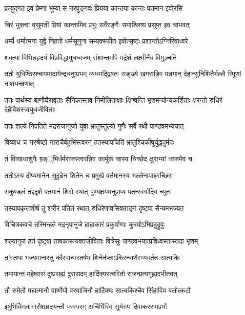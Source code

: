 \twolineshloka
{प्रत्युद्गत इव प्रेम्णा भूम्या स नरपुङ्गवः}
{प्रियया कान्तया कान्तः पतमान इवोरसि}


\twolineshloka
{चिरं भुक्त्वा वसुमतीं प्रियां कान्तामिव प्रभुः}
{सर्वैरङ्गैः समाश्लिष्य प्रसुप्त इव चाभवत्}


\twolineshloka
{धर्म्ये धर्मात्मना युद्वे निहतो धर्मसूनुना}
{सम्यक्स्फीत इवोत्सृष्टः प्रशान्तोऽग्निरिवाध्वरे}


\twolineshloka
{शक्त्या विभिन्नहृदयं विप्रविद्धायुधध्वजम्}
{संशान्तमपि मद्रेशं लक्ष्मीर्नैव विमुञ्चति}


\threelineshloka
{ततो युधिष्ठिरश्चापमादायेन्द्रधनुष्प्रभम्}
{व्यधमद्द्विषतः सङ्ख्ये खगराडिव पन्नगान्}
{देहान्सुनिशितैर्भल्लै रिपूणां नाशयन्क्षणात्}


\threelineshloka
{ततः पार्थस्य बाणौघैरावृताः सैनिकास्तव}
{निमीलिताक्षाः क्षिण्वन्ति भृशमन्योन्यकर्शिताः}
{क्षरन्तो रुधिरं देहैर्विशस्त्रायुधजीविताः}


\twolineshloka
{ततः शल्ये निपतिते मद्रराजानुजो युवा}
{भ्रातुस्तुल्यो गुणैः सर्वै रथी पाण्डवमभ्ययात्}


\twolineshloka
{विव्याध च नरश्रेष्ठो नाराचैर्बहुभिस्त्वरन्}
{हतस्यापचितिं भ्रातुश्चिकीषुर्युद्धदुर्मदः}


\twolineshloka
{तं विव्याधाशुगैः ष़ड््भिर्धर्मराजस्त्वरन्निव}
{कार्मुकं चास्य चिच्छेद क्षुराभ्यां ध्वजमेव च}


\twolineshloka
{ततोऽस्य दीप्यमानेन सुदृढेन शितेन च}
{प्रमुखे वर्तमानस्य भल्लेनापाहरच्छिरः}


\twolineshloka
{सकुण्डलं तद्ददृशे पतमानं शिरो रथात्}
{पुण्यक्षयमनुप्राप्य पतन्स्वर्गादिव च्युतः}


\twolineshloka
{तस्यापकृत्तशीर्षं तु शरीरं पतितं रथात्}
{रुधिरेणावसिक्ताङ्गं दृष्ट्वा सैन्यमभज्यत}


\twolineshloka
{विचित्रकवचे तस्मिन्हते मद्रनृपानुजे}
{हाहाकारं प्रकुर्वाणाः कुरवोऽभिप्रदुद्रुवुः}


\twolineshloka
{शल्यानुजं हतं दृष्ट्वा तावकास्त्यक्तजीविताः}
{वित्रेसुः पाण्डवभयात्प्रविध्वस्तास्तदा भृशम्}


\twolineshloka
{तांस्तथा भज्यमानांस्तु कौरवान्भरतर्षभ}
{शिनेर्नप्ताऽकिरन्बाणैरभ्यवर्तत सात्यकिः}


\twolineshloka
{तमायान्तं महेष्वासं दुष्प्रसह्यं दुरासदम्}
{हार्दिक्यस्त्वरितो राजन्प्रत्यगृह्णादभीतवत्}


\twolineshloka
{तौ समेतौ महात्मानौ वार्ष्णेयौ वरवाजिनौ}
{हार्दिक्यः सात्यकिश्चैव सिंहाविव बलोत्कटौ}


\twolineshloka
{इषुभिर्विमलाभासैश्छादयन्तौ परस्परम्}
{अर्चिर्भिरिव सूर्यस्य दिवाकरसमप्रभौ}


